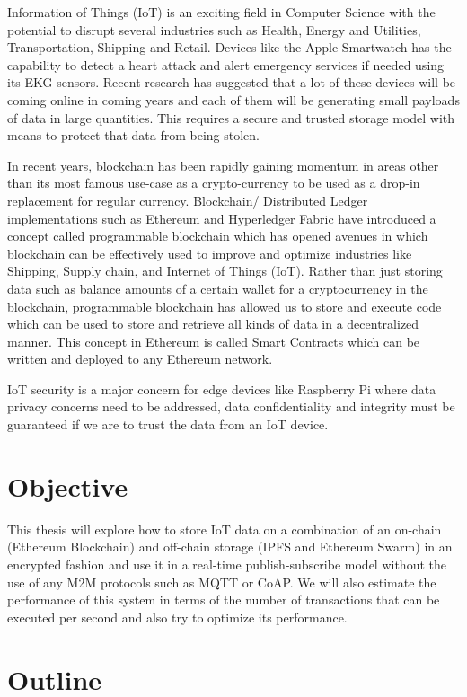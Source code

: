 \documentclass[11pt,openright]{report}
\begin{document}
Information of Things (IoT) is an exciting field in Computer Science with the potential to disrupt several industries such as Health, Energy and Utilities, Transportation, Shipping and Retail. Devices like the Apple Smartwatch has the capability to detect a heart attack and alert emergency services if needed using its EKG sensors. Recent research has suggested that a lot of these devices will be coming online in coming years and each of them will be generating small payloads of data in large quantities. This requires a secure and trusted storage model with means to protect that data from being stolen. 

In recent years, blockchain has been rapidly gaining momentum in areas other than its most famous use-case as a crypto-currency to be used as a drop-in replacement for regular currency. Blockchain/ Distributed Ledger implementations such as Ethereum and Hyperledger Fabric have introduced a concept called programmable blockchain which has opened avenues in which blockchain can be effectively used to improve and optimize industries like Shipping, Supply chain, and Internet of Things (IoT). Rather than just storing data such as balance amounts of a certain wallet for a cryptocurrency in the blockchain, programmable blockchain has allowed us to store and execute code which can be used to store and retrieve all kinds of data in a decentralized manner. This concept in Ethereum is called Smart Contracts which can be written and deployed to any Ethereum network.

IoT security is a major concern for edge devices like Raspberry Pi where data privacy concerns need to be addressed, data confidentiality and integrity must be guaranteed if we are to trust the data from an IoT device. 

\section{Objective}\label{section:objective}
This thesis will explore how to store IoT data on a combination of an
on-chain (Ethereum Blockchain) and off-chain storage (IPFS and Ethereum
Swarm) in an encrypted fashion and use it in a real-time
publish-subscribe model without the use of any M2M protocols such as MQTT
or CoAP. We will also estimate the performance of this system in terms of
the number of transactions that can be executed per second and also try
to optimize its performance.

\section{Outline}\label{section:outline}
\end{document}
